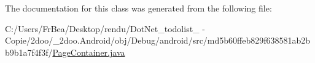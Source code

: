 The documentation for this class was generated from the following file:\begin{CompactItemize}
\item 
C:/Users/FrBea/Desktop/rendu/DotNet\_\-todolist\_ - Copie/2doo/\_\-2doo.Android/obj/Debug/android/src/md5b60ffeb829f638581ab2bb9b1a7f4f3f/\hyperlink{_page_container_8java}{PageContainer.java}\end{CompactItemize}
